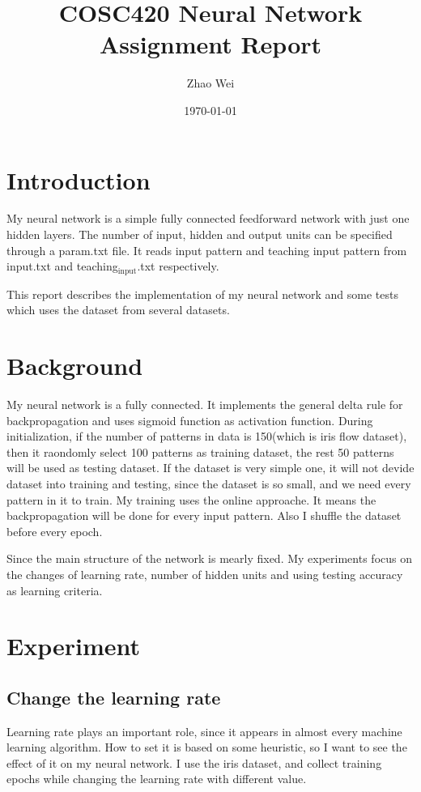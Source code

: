 \documentclass[11pt]{article}
\author{Zhao Wei}
\date{\today}
\title{COSC420 Neural Network Assignment Report}
\begin{document}
\maketitle
\tableofcontents


\section{Introduction}
\label{sec-1}
My neural network is a simple fully connected feedforward network with just one hidden layers. The number of input, hidden and output units can be specified through a param.txt file. It reads input pattern and teaching input pattern from input.txt and teaching$_{\text{input}}$.txt respectively. 

This report describes the implementation of my neural network and some tests which uses the dataset from several datasets. 
\section{Background}
\label{sec-2}
My neural network is a fully connected. It implements the general delta rule for backpropagation and uses sigmoid function as activation function. During initialization, if the number of patterns in data is 150(which is iris flow dataset), then it raondomly select 100 patterns as training dataset, the rest 50 patterns will be used as testing dataset. If the dataset is very simple one, it will not devide dataset into training and testing, since the dataset is so small, and we need every pattern in it to train. My training uses the online approache. It means the backpropagation will be done for every input pattern. Also I shuffle the dataset before every epoch.

Since the main structure of the network is mearly fixed. My experiments focus on the changes of learning rate, number of hidden units and using testing accuracy as learning criteria.

\section{Experiment}
\label{sec-3}
\subsection{Change the learning rate}
\label{sec-3-1}
Learning rate plays an important role, since it appears in almost every machine learning algorithm. How to set it is based on some heuristic, so I want to see the effect of it on my neural network. I use the iris dataset, and collect training epochs while changing the learning rate with different value.
\end{document}
